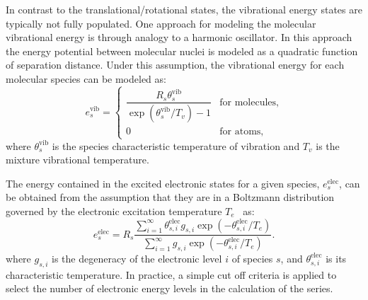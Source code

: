 \documentclass[10pt]{article}
\newcommand{\elec}{\text{elec}}
\newcommand{\vib}{\text{vib}}
\begin{document}
In contrast to the translational/rotational states, the vibrational energy states are typically not fully populated. One approach for modeling the molecular vibrational energy is through analogy to a harmonic oscillator.  In this approach the energy potential between molecular nuclei is modeled as a quadratic function of separation distance.  Under this assumption, the vibrational energy for each molecular species can be modeled as:
\begin{equation}
  \label{eq:species_vibrational_energy}
  e^{\text{vib}}_s = 
  \begin{cases}    
    \dfrac{R_s\theta^{\vib}_{s}}{\exp\left(\theta^{\vib}_{s}/T_v\right) - 1} & \text{for molecules}, \\
    0 & \text{for atoms},
  \end{cases}
\end{equation}
where $\theta^{\vib}_{s}$ is the species characteristic temperature of vibration and $T_v$ is the mixture vibrational temperature.


The energy contained in the excited electronic states for a given species, $e^{\elec}_s$, can be obtained from the assumption that they are in a Boltzmann distribution governed by the electronic excitation temperature $T_e$~\citep{candler_thesis} as:
\begin{equation}
  \label{eq:elec_excitation}
  e^{\elec}_s = R_s \dfrac{\sum_{i=1}^\infty \theta^{\elec}_{s,i} g_{s,i} \exp\left(-\theta^{\elec}_{s,i}/T_e\right)}{ \sum_{i=1}^\infty g_{s,i} \exp\left(-\theta^{\elec}_{s,i}/T_e\right)}.
\end{equation}
where $g_{s,i}$ is the degeneracy of the electronic level $i$ of species $s$, and  $\theta^{\elec}_{s,i}$ is its characteristic temperature. In practice, a simple cut off criteria is applied to select the number of electronic energy levels in the calculation of the series. 
\end{document}
